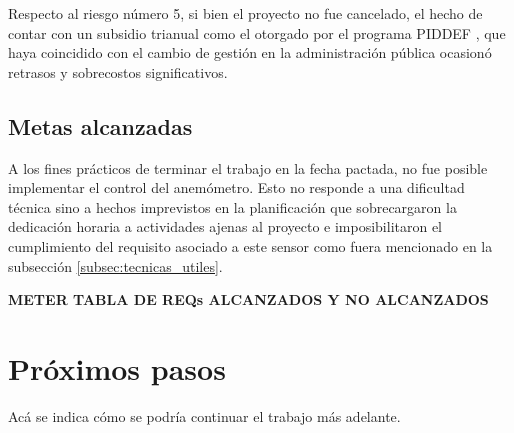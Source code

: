 Respecto al riesgo número 5, si bien el proyecto no fue cancelado, el hecho de contar con un subsidio trianual como el otorgado por el programa PIDDEF \citep{PIDDEF}, que haya coincidido con el cambio de gestión en la administración pública ocasionó retrasos y sobrecostos significativos.

\subsection{Metas alcanzadas}
\label{subsec:metasalcanzadas}

A los fines prácticos de terminar el trabajo en la fecha pactada, no fue posible implementar el control del anemómetro.  Esto no responde a una dificultad técnica sino a hechos imprevistos en la planificación que sobrecargaron la dedicación horaria a actividades ajenas al proyecto e imposibilitaron el cumplimiento del requisito asociado a este sensor como fuera mencionado en la subsección \ref{subsec:tecnicas_utiles}.

\textbf{METER TABLA DE REQs ALCANZADOS Y NO ALCANZADOS}

\section{Próximos pasos}

Acá se indica cómo se podría continuar el trabajo más adelante.
